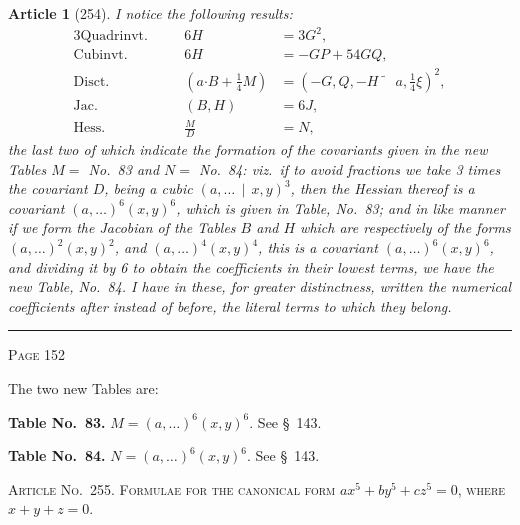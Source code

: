 \documentclass[11pt,a4paper]{article}
\theoremstyle{cayley}
\newtheorem{art}{Article}
\begin{document}
\begin{art}[254]
I notice the following results:
\begin{alignat*}{3}
\text{Quadrinvt.} &\quad& 6H &= 3G^2, \\
\text{Cubinvt.} &\quad& 6H &= -GP + 54GQ, \\
\text{Disct.} &\quad& (a\boldsymbol{\cdot}B + \tfrac{1}{4}M) &= (-G, Q, -H\!\!\widetilde{\phantom{aa}}\,a, \tfrac{1}{4}\xi)^2, \\
\text{Jac.} &\quad& (B, H) &= 6J, \\
\text{Hess.} &\quad& \frac{M}{D} &= N,
\end{alignat*}
the last two of which indicate the formation of the covariants given in the new Tables $M=$ No.~83 and $N=$ No.~84: viz.\ if to avoid fractions we take 3 times the covariant $D$, being a cubic $(a, \ldots \,\mid\, x, y)^3$, then the Hessian thereof is a covariant $(a, \ldots)^6(x, y)^6$, which is given in Table, No.~83; and in like manner if we form the Jacobian of the Tables $B$ and $H$ which are respectively of the forms $(a, \ldots)^2(x, y)^2$, and $(a, \ldots)^4(x, y)^4$, this is a covariant $(a, \ldots)^6(x, y)^6$, and dividing it by 6 to obtain the coefficients in their lowest terms, we have the new Table, No.~84. I have in these, for greater distinctness, written the numerical coefficients after instead of before, the literal terms to which they belong.
\end{art}

\vspace{1em}
\noindent\rule{\textwidth}{0.4pt}
\begin{center}\textsc{Page 152}\end{center}
\newpage

\noindent
The two new Tables are:\par
\medskip
\noindent
\textbf{Table No.~83.} $M = (a, \ldots)^6(x, y)^6$. See \S\ 143.\par
\medskip
\noindent
\textbf{Table No.~84.} $N = (a, \ldots)^6(x, y)^6$. See \S\ 143.\par
\medskip

\begin{center}
\textsc{Article No.\ 255. Formulae for the canonical form} $ax^5 + by^5 + cz^5 = 0$,
\textsc{where} $x + y + z = 0$.
\end{center}
\end{document}
